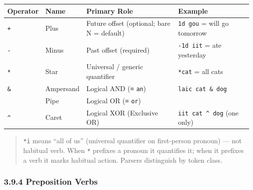 {\def\LTcaptype{} %
\begin{longtable}[]{@{}
  >{\raggedright\arraybackslash}p{}
  >{\raggedright\arraybackslash}p{}
  >{\raggedright\arraybackslash}p{}
  >{\raggedright\arraybackslash}p{}@{}}
\toprule\noalign{}
\begin{minipage}[b]{\linewidth}\raggedright
Operator
\end{minipage} & \begin{minipage}[b]{\linewidth}\raggedright
Name
\end{minipage} & \begin{minipage}[b]{\linewidth}\raggedright
Primary Role
\end{minipage} & \begin{minipage}[b]{\linewidth}\raggedright
Example
\end{minipage} \\
\midrule\noalign{}
\endhead
\bottomrule\noalign{}
\endlastfoot
\texttt{+} & Plus & Future offset (optional; bare N = default) &
\texttt{1d\ gou} = will go tomorrow \\
\texttt{-} & Minus & Past offset (required) & \texttt{-1d\ iit} = ate
yesterday \\
\texttt{*} & Star & Universal / generic quantifier & \texttt{*cat} = all
cats \\
\texttt{\&} & Ampersand & Logical AND (≡ \texttt{an}) &
\texttt{laic\ cat\ \&\ dog} \\
\texttt{\textbar{}} & Pipe & Logical OR (≡ \texttt{or}) & \\
\texttt{\^{}} & Caret & Logical XOR (Exclusive OR) &
\texttt{iit\ cat\ \^{}\ dog} (one only) \\
\end{longtable}
}

\begin{quote}
\texttt{*i} means ``all of us'' (universal quantifier on first-person
pronoun) --- not habitual verb. When \texttt{*} prefixes a pronoun it
quantifies it; when it prefixes a verb it marks habitual action. Parsers
distinguish by token class.
\end{quote}

\subsubsection{3.9.4 Preposition Verbs}\label{preposition-verbs}

